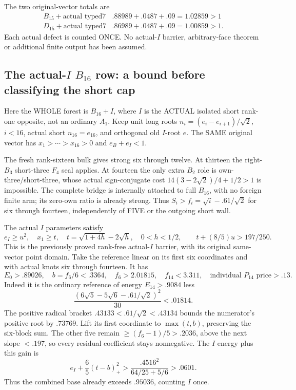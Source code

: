\documentclass[11pt]{article}
\begin{document}
The two original-vector totals are
\[
 \begin{array}{c|c}
 B_{15}+\text{actual typed7}&.88989+.0487+.09=1.02859>1\\
 D_{15}+\text{actual typed7}&.86989+.0487+.09=1.00859>1 .
 \end{array}
\]
Each actual defect is counted ONCE.
No actual-\(I\) barrier, arbitrary-face
theorem or additional finite output
has been assumed.

\subsection[The actual-I B16 row: a bound before classifying the short cap]{The actual-\(I\) \(B_{16}\) row: a bound before classifying the short cap}
\label{app:arithB16Ishort}

Here the WHOLE forest is \(B_{16}+I\),
where \(I\) is the ACTUAL isolated short
rank-one opposite, not an ordinary \(A_1\).
Keep unit long roots
\(n_i=(e_i-e_{i+1})/\sqrt2\), \(i<16\),
actual short \(n_{16}=e_{16}\), and
orthogonal old \(I\)-root \(e\).
The SAME original vector has
\(x_1>\cdots>x_{16}>0\) and
\(e_B+e_I<1\).

The fresh rank-sixteen bulk gives strong
six through twelve.
At thirteen the right-\(B_3\) short-three
\(F_4\) seal applies.
At fourteen the only extra \(B_2\)
role is own-three/short-three, whose
actual sign-conjugate cost
\(14(3-2\sqrt2)/4+1/2>1\) is impossible.
The complete bridge is internally attached
to full \(B_{16}\), with no foreign
finite arm; its zero-own ratio is already
strong.
Thus \(S_i>f_i=\sqrt i-.61/\sqrt2\)
for six through fourteen, independently
of FIVE or the outgoing short wall.

The actual \(I\) parameters satisfy
\[
 e_I\ge u^2,\quad x_1\ge t,\quad
 t=\sqrt{1+4h}-2\sqrt h,\quad0<h<1/2,\qquad
                        t+(8/5)u>197/250 .
\]
This is the previously proved rank-free
actual-\(I\) barrier, with its original
same-vector point domain.
Take the reference linear on its first
six coordinates and with actual knots
six through fourteen.
It has
\[
 E_0>.89026,\quad b=f_6/6<.3364,\quad
 f_6>2.01815,\quad f_{14}<3.311,\quad
                   \text{individual }P_{14}\text{ price}>.13 .
\]
Indeed it is the ordinary reference of
energy \(E_{14}>.9084\) less
\[
               {\frac{(6\sqrt5-5\sqrt6-.61/\sqrt2)^2}{30}}<.01814 .
\]
The positive radical bracket
\(.43133<.61/\sqrt2<.43134\)
bounds the numerator's positive root by
\(.73769\).
Lift its first coordinate to \(\max(t,b)\),
preserving the six-block sum.
The other five remain
\(\ge(f_6-1)/5>.2036\), above the next
slope \(<.197\), so every residual
coefficient stays nonnegative.
The \(I\) energy plus this gain is
\[
       e_I+{\frac{6}{5}}(t-b)_+^2
          >{\frac{.4516^2}{64/25+5/6}}>.0601 .
\]
Thus the combined base already exceeds
\(.95036\), counting \(I\) once.
\end{document}

